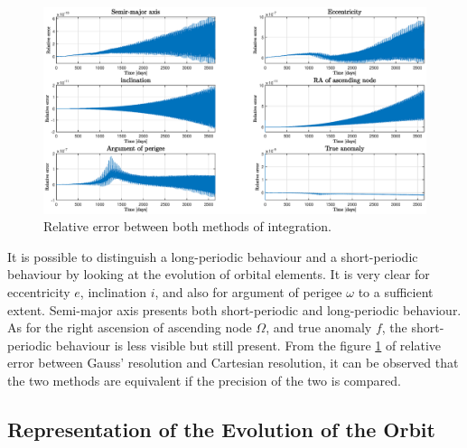 \documentclass{article}
\begin{document}
\begin{figure}[H]
	\centering
	\includegraphics[width=1\textwidth]{relative_error10yrs.eps}
	\caption{Relative error between both methods of integration.}
	\label{fig:relative_error10yrs}
\end{figure}

It is possible to distinguish a long-periodic behaviour and a short-periodic behaviour by looking at the evolution of orbital elements. It is very clear for eccentricity \( e \), inclination \( i \), and also for argument of perigee \( \omega \) to a sufficient extent. Semi-major axis presents both short-periodic and long-periodic behaviour. As for the right ascension of ascending node \( \Omega \), and true anomaly \( f \), the short-periodic behaviour is less visible but still present. From the figure \ref{fig:relative_error10yrs} of relative error between Gauss’ resolution and Cartesian resolution, it can be observed that the two methods are equivalent if the precision of the two is compared.

\subsection{Representation of the Evolution of the Orbit} 
\end{document}
